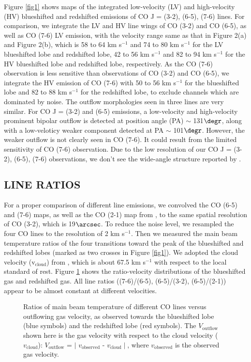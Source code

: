 Figure \ref{fig1} shows maps of the integrated low-velocity (LV) and high-velocity (HV) blueshifted and redshifted emissions of CO J = (3-2), (6-5), (7-6) lines. For comparison, we integrate the LV and HV line wings of CO (3-2) and CO (6-5), as well as CO (7-6) LV emission, with the velocity range same as that in \citet{2009ApJ...696...66Q} Figure 2(a) and Figure 2(b), which is 58 to 64 km s$^{-1} $ and 74 to 80 km s$^{-1}$ for the LV blueshifted lobe and redshifted lobe, 42 to 56 km s$^{-1} $ and 82 to 94 km s$^{-1}$ for the HV blueshifted lobe and redshifted lobe, respectively. As the CO (7-6) observation is less sensitive than observations of CO (3-2) and CO (6-5), we integrate the HV emission of CO (7-6) with 50 to 56 km s$^{-1} $ for the blueshifted lobe and 82 to 88 km s$^{-1}$ for the redshifted lobe, to exclude channels which are dominated by noise. The outflow morphologies seen in three lines are very similar. For CO J = (3-2) and (6-5) emissions, a low-velocity and high-velocity prominent bipolar outflow is detected at position angle (PA) $\sim$ 131${\degr}$, along with a low-veloticy weaker component detected at PA $\sim$ 101${\degr}$. However, the weaker outflow is not clearly seen in CO (7-6). It could result from the limited sensitivity of CO (7-6) observation. Due to the low resolution of our CO J = (3-2), (6-5), (7-6) observations, we don't see the wide-angle structure reported by \citet{2009ApJ...696...66Q}.

\subsection{LINE RATIOS}
For a proper comparison of different line emissions, we convolved the CO (6-5) and (7-6) maps, as well as the CO (2-1) map from \citet{2009ApJ...696...66Q}, to the same spatial resolution of CO (3-2), which is 19${\arcsec}$. To reduce the noise level, we resampled the four CO lines to the resolution of 2 km s$^{-1}$. Then we measured the main beam temperature ratios of the four transitions toward the peak of the blueshifted and redshifted lobes (marked as two crosses in Figure \ref{fig1}). We adopted the cloud velocity (v$_{\mathrm{cloud}}$) from \citet{2003A&A...412..175K}, which is about 67.5 km s$^{-1}$ with respect to the local standard of rest. Figure \ref{fig2} shows the ratio-velocity distributions of the blueshifted gas and redshifted gas. All line ratios ((7-6)/(6-5), (6-5)/(3-2), (6-5)/(2-1)) appear to be almost constant at different velocities.

\begin{figure}[tbp]
\caption{Ratios of main beam temperature of different CO lines versus outflowing gas velocity, as observed towards the blueshifted lobe (blue symbols) and the redshifted lobe (red symbols). The $V_{\mathrm{outflow}}$ shown here is the gas velocity with respect to the cloud velocity ($v_{\mathrm{cloud}}$): $V_{\mathrm{outflow}}$ = $\mid$ $v_{\mathrm{observed}}$ - $v_{\mathrm{cloud}}\mid$, where $v_{\mathrm{observed}}$ is the observed gas velocity. \label{fig2}}
\end{figure}

